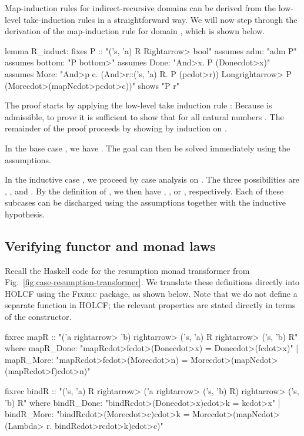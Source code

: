 Map-induction rules for indirect-recursive domains can be derived from the low-level take-induction rules in a straightforward way. We will now step through the derivation of the map-induction rule for domain , which is shown below.
%
\begin{isacode}
lemma R_induct:
  fixes P :: "('s, 'a) R \<Rightarrow> bool"
  assumes adm: "adm P"
  assumes bottom: "P \<bottom>"
  assumes Done: "\<And>x. P (Done\<cdot>x)"
  assumes More: "\<And>p c. (\<And>r::('s, 'a) R. P (p\<cdot>r)) \<Longrightarrow> P (More\<cdot>(mapN\<cdot>p\<cdot>c))"
  shows "P r"
\end{isacode}

The proof starts by applying the low-level take induction rule : Because  is admissible, to prove  it is sufficient to show that  for all natural numbers . The remainder of the proof proceeds by showing  by induction on .

In the base case , we have . The goal  can then be solved immediately using the assumptions.

In the inductive case , we proceed by case analysis on . The three possibilities are , , and . By the definition of , we then have , , or , respectively. Each of these subcases can be discharged using the assumptions together with the inductive hypothesis.

\subsection{Verifying functor and monad laws}
\label{sec:case-verify-R}

Recall the Haskell code for the resumption monad transformer from Fig.~\ref{fig:case-resumption-transformer}. We translate these definitions directly into HOLCF using the \textsc{Fixrec} package, as shown below. Note that we do not define a separate  function in HOLCF; the relevant properties are stated directly in terms of the  constructor.

\begin{isacode}
fixrec mapR :: "('a \<rightarrow> 'b) \<rightarrow> ('s, 'a) R \<rightarrow> ('s, 'b) R"
  where mapR_Done: "mapR\<cdot>f\<cdot>(Done\<cdot>x) = Done\<cdot>(f\<cdot>x)"
  | mapR_More: "mapR\<cdot>f\<cdot>(More\<cdot>n) = More\<cdot>(mapN\<cdot>(mapR\<cdot>f)\<cdot>n)"
\end{isacode}
\unmedskip
{}
\begin{isacode}
fixrec bindR :: "('s, 'a) R \<rightarrow> ('a \<rightarrow> ('s, 'b) R) \<rightarrow> ('s, 'b) R"
  where bindR_Done: "bindR\<cdot>(Done\<cdot>x)\<cdot>k = k\<cdot>x"
  | bindR_More: "bindR\<cdot>(More\<cdot>c)\<cdot>k = More\<cdot>(mapN\<cdot>(\<Lambda> r. bindR\<cdot>r\<cdot>k)\<cdot>c)"
\end{isacode}

